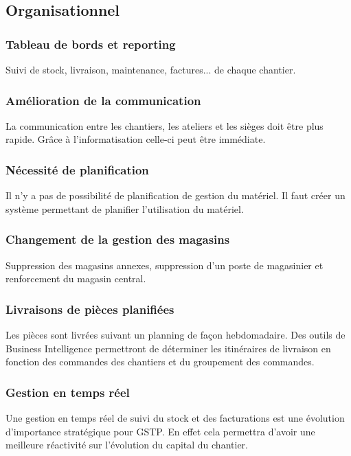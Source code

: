 \subsection{Organisationnel}

\subsubsection{Tableau de bords et reporting}

Suivi de stock, livraison, maintenance, factures... de chaque chantier.

\subsubsection{Amélioration de la communication}

La communication entre les chantiers, les ateliers et les sièges doit être plus rapide. 
Grâce à l’informatisation celle-ci peut être immédiate.

\subsubsection{Nécessité de planification}

Il n’y a pas de possibilité de planification de gestion du matériel. 
Il faut créer un système permettant de planifier l’utilisation du matériel.

\subsubsection{Changement de la gestion des magasins}
Suppression des magasins annexes, suppression d’un poste de magasinier et renforcement du magasin central.

\subsubsection{Livraisons de pièces planifiées}
Les pièces sont livrées suivant un planning de façon hebdomadaire. 
Des outils de Business Intelligence permettront de déterminer les itinéraires de
 livraison en fonction des commandes des chantiers et du groupement des commandes.

\subsubsection{Gestion en temps réel}
Une gestion en temps réel de suivi du stock et des facturations est une évolution 
d’importance stratégique pour GSTP. En effet cela permettra d’avoir une meilleure
 réactivité sur l’évolution du capital du chantier.

